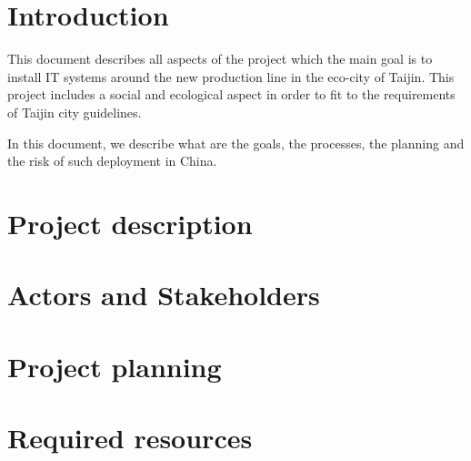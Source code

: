 \documentclass{article}
\begin{document}
\section{Introduction}

This document describes all aspects of the \projectname project which the main goal is to install IT systems around the new production line in the eco-city of Taijin.
This project includes a social and ecological aspect in order to fit to the requirements of Taijin city guidelines.

In this document, we describe what are the goals, the processes, the planning and the risk of such deployment in China.

\section{Project description}




\section{Actors and Stakeholders}


\section{Project planning}




\section{Required resources}

\end{document}
